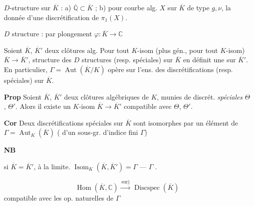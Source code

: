\documentclass[11pt,a4paper]{article}
\begin{document}
$D$-structure sur $\overline{K}$ : a) $\overline{\mathbb{Q}} \subset \overline{K}$ ; b) pour  courbe alg. $X$ sur $\overline{K}$ de type $g,\nu$, la donnée d'une discrétification de $\pi_1(X)$.

$D$ structure  :  par plongement $\varphi : \overline{K} \to \mathbb{C}$


Soient $\overline{K}$, $\overline{K}'$ deux clôtures alg. Pour tout $K$-\struck{\ill{}}isom (plus gén., pour tout $K$-isom) $\overline{K} \to \overline{K}'$,  structure des $D$ structures (resp. spéciales) sur $\overline{K}$ en définit une sur $\overline{K}'$. En particulier, $\Gamma = \operatorname{Aut}(\overline{K}/K)$ opère sur l'ens. des discrétifications (resp. spéciales) sur $\overline{K}$.

\textbf{Prop} Soient $\overline{K}$, $\overline{K}'$ deux clôtures algébriques de $K$, munies de discrét. \emph{spéciales} $\Theta$, $\Theta'$. Alors il existe un $K$-isom $\overline{K} \to \overline{K}'$ compatible avec $\Theta$, $\Theta'$.

\textbf{Cor} Deux discrétifications spéciales sur $\overline{K}$ sont isomorphes par un élément de $\Gamma = \operatorname{Aut}_K(\overline{K})$ (\ill{} \add{\ill{}} d'un sous-gr. d'indice fini  $\Gamma$)

\textbf{NB}


\struck{\ill{}} \add{\ill{}}  \struck{\ill{}} si $\overline{K} = \overline{K}'$, \ill{} \ill{} à la limite. $\operatorname{Isom}_K(\overline{K},\overline{K}') = \Gamma$ — \ill{} $\Gamma$ .

\[
\operatorname{Hom}(\overline{K},\mathbb{C}) \xrightarrow{\ \text{surj}\ } \operatorname{Discspec}(\overline{K})
\]
\struck{\ill{}} compatible avec les op. naturelles de $\Gamma$
\end{document}
